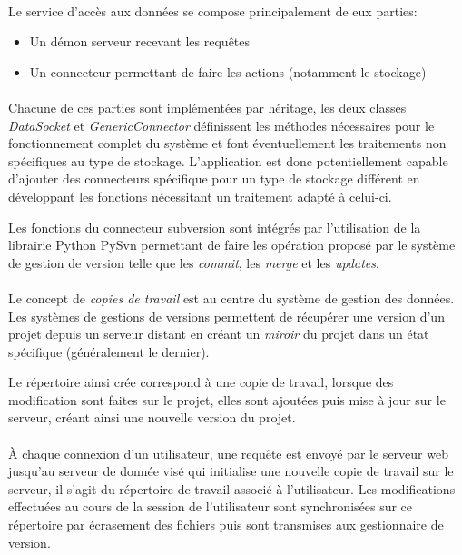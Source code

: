 \documentclass[a4paper,12pt]{article}
\begin{document}
\paragraph{}
Le service d'accès aux données se compose principalement de eux parties:

\begin{itemize}
\item Un démon serveur recevant les requêtes
\item Un connecteur permettant de faire les actions (notamment le stockage)
\end{itemize}

\paragraph{}
Chacune de ces parties sont implémentées par héritage, les deux classes \emph{DataSocket} et \emph{GenericConnector} définissent les méthodes nécessaires pour le fonctionnement complet du système et font éventuellement les traitements non spécifiques au type de stockage.
L'application est donc potentiellement capable d'ajouter des connecteurs spécifique pour un type de stockage différent en développant les fonctions nécessitant un traitement adapté à celui-ci.

Les fonctions du connecteur subversion sont intégrés par l'utilisation de la librairie Python PySvn permettant de faire les opération proposé par le système de gestion de version telle que les \emph{commit}, les \emph{merge} et les \emph{updates}.

\paragraph{}
Le concept de \emph{copies de travail} est au centre du système de gestion des données.
Les systèmes de gestions de versions permettent de récupérer une version d'un projet depuis un serveur distant en créant un \emph{miroir} du projet dans un état spécifique (généralement le dernier).

Le répertoire ainsi crée correspond à une copie de travail, lorsque des modification sont faites sur le projet, elles sont ajoutées puis mise à jour sur le serveur, créant ainsi une nouvelle version du projet.

\paragraph{}
\`A chaque connexion d'un utilisateur, une requête est envoyé par le serveur web jusqu'au serveur de donnée visé qui initialise une nouvelle copie de travail sur le serveur, il s'agit du répertoire de travail associé à l'utilisateur.
Les modifications effectuées au cours de la session de l'utilisateur sont synchronisées sur ce répertoire par écrasement des fichiers puis sont transmises aux gestionnaire de version.
\end{document}
